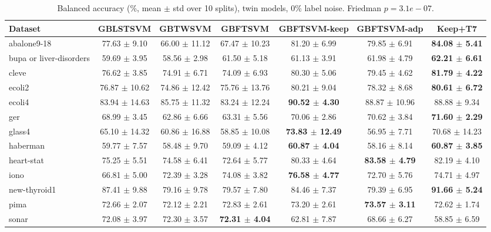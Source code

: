\begin{table}[t]
\centering\small
\caption{Balanced accuracy (\%, mean $\pm$ std over 10 splits), twin models, 0\% label noise. Friedman $p = 3.1e-07$.}
\begin{tabular}{lcccccc}
\toprule
Dataset & GBLSTSVM & GBTWSVM & GBFTSVM & GBFTSVM-keep & GBFTSVM-adp & Keep+T7 \\
\midrule
abalone9-18 & 77.63 $\pm$ 9.10 & 66.00 $\pm$ 11.12 & 67.47 $\pm$ 10.23 & 81.20 $\pm$ 6.99 & 79.85 $\pm$ 6.91 & \textbf{84.08 $\pm$ 5.41} \\
bupa or liver-disorders & 59.69 $\pm$ 3.95 & 58.56 $\pm$ 2.98 & 61.50 $\pm$ 5.18 & 61.13 $\pm$ 3.91 & 61.98 $\pm$ 4.79 & \textbf{62.21 $\pm$ 6.61} \\
cleve & 76.62 $\pm$ 3.85 & 74.91 $\pm$ 6.71 & 74.09 $\pm$ 6.93 & 80.30 $\pm$ 5.06 & 79.45 $\pm$ 4.62 & \textbf{81.79 $\pm$ 4.22} \\
ecoli2 & 76.87 $\pm$ 10.62 & 74.86 $\pm$ 12.42 & 75.76 $\pm$ 13.76 & 80.21 $\pm$ 9.04 & 78.32 $\pm$ 8.68 & \textbf{80.61 $\pm$ 6.72} \\
ecoli4 & 83.94 $\pm$ 14.63 & 85.75 $\pm$ 11.32 & 83.24 $\pm$ 12.24 & \textbf{90.52 $\pm$ 4.30} & 88.87 $\pm$ 10.96 & 88.88 $\pm$ 9.34 \\
ger & 68.99 $\pm$ 3.45 & 62.86 $\pm$ 6.66 & 63.31 $\pm$ 5.56 & 70.06 $\pm$ 2.86 & 70.62 $\pm$ 3.84 & \textbf{71.60 $\pm$ 2.29} \\
glass4 & 65.10 $\pm$ 14.32 & 60.86 $\pm$ 16.88 & 58.85 $\pm$ 10.08 & \textbf{73.83 $\pm$ 12.49} & 56.95 $\pm$ 7.71 & 70.68 $\pm$ 14.23 \\
haberman & 59.77 $\pm$ 7.57 & 58.48 $\pm$ 9.70 & 59.09 $\pm$ 4.12 & \textbf{60.87 $\pm$ 4.04} & 58.16 $\pm$ 8.14 & \textbf{60.87 $\pm$ 3.85} \\
heart-stat & 75.25 $\pm$ 5.51 & 74.58 $\pm$ 6.41 & 72.64 $\pm$ 5.77 & 80.33 $\pm$ 4.64 & \textbf{83.58 $\pm$ 4.79} & 82.19 $\pm$ 4.10 \\
iono & 66.81 $\pm$ 5.00 & 72.39 $\pm$ 3.28 & 74.08 $\pm$ 3.82 & \textbf{76.58 $\pm$ 4.77} & 72.70 $\pm$ 5.76 & 74.71 $\pm$ 4.97 \\
new-thyroid1 & 87.41 $\pm$ 9.88 & 79.16 $\pm$ 9.78 & 79.57 $\pm$ 7.80 & 84.46 $\pm$ 7.37 & 79.39 $\pm$ 6.95 & \textbf{91.66 $\pm$ 5.24} \\
pima & 72.66 $\pm$ 2.07 & 72.12 $\pm$ 2.21 & 72.83 $\pm$ 2.61 & 73.20 $\pm$ 2.61 & \textbf{73.57 $\pm$ 3.11} & 72.62 $\pm$ 1.74 \\
sonar & 72.08 $\pm$ 3.97 & 72.30 $\pm$ 3.57 & \textbf{72.31 $\pm$ 4.04} & 62.81 $\pm$ 7.87 & 68.66 $\pm$ 6.27 & 58.85 $\pm$ 6.59 \\

\end{tabular}
\end{table}
